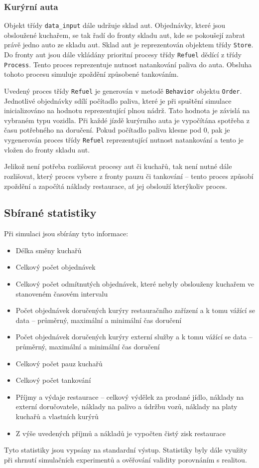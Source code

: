 \documentclass[a4paper, 11pt]{article}
\begin{document}
\subsubsection{Kurýrní auta}
Objekt třídy \texttt{data\_input} dále udržuje sklad aut. Objednávky, které jsou obsloužené kuchařem, se tak řadí do fronty skladu aut, kde se pokoušejí zabrat právě jedno auto ze skladu aut. Sklad aut je reprezentován objektem třídy \texttt{Store}. Do fronty aut jsou dále vkládány prioritní procesy třídy \texttt{Refuel} dědící z třídy \texttt{Process}. Tento proces reprezentuje nutnost natankování paliva do auta. Obsluha tohoto procesu simuluje zpoždění způsobené tankováním.

Uvedený proces třídy \texttt{Refuel} je generován v metodě \texttt{Behavior} objektu \texttt{Order}. Jednotlivé objednávky sdílí počítadlo paliva, které je při spuštění simulace inicializováno na hodnotu reprezentující plnou nádrž. Tato hodnota je závislá na vybraném typu vozidla. Při každé jízdě kurýrního auta je vypočítána spotřeba z času potřebného na doručení. Pokud počítadlo paliva klesne pod 0, pak je vygenerován proces třídy \texttt{Refuel} reprezentující nutnost natankování a tento je vložen do fronty skladu aut. 

Jelikož není potřeba rozlišovat procesy aut či kuchařů, tak není nutné dále rozlišovat, který proces vybere z fronty pauzu či tankování -- tento proces způsobí zpoždění a započítá náklady restaurace, ať jej obslouží kterýkoliv proces. 

\subsection{Sbírané statistiky}
Při simulaci jsou sbírány tyto informace:
\begin{itemize}
\item Délka směny kuchařů
\item Celkový počet objednávek
\item Celkový počet odmítnutých objednávek, které nebyly obslouženy kuchařem ve stanoveném časovém intervalu
\item Počet objednávek doručených kurýry restauračního zařízení a k tomu vážící se data -- průměrný, maximální a minimální čas doručení
\item Počet objednávek doručených kurýry externí služby a k tomu vážící se data -- průměrný, maximální a minimální čas doručení
\item Celkový počet pauz kuchařů
\item Celkový počet tankování
\item Příjmy a výdaje restaurace -- celkový výdělek za prodané jídlo, náklady na externí doručovatele, náklady na palivo a údržbu vozů, náklady na platy kuchařů a vlastních kurýrů
\item Z výše uvedených příjmů a nákladů je vypočten čistý zisk restaurace
\end{itemize}
Tyto statistiky jsou vypsány na standardní výstup. Statistiky byly dále využity při shrnutí simulačních experimentů a ověřování validity porovnáním s realitou.
\end{document}
